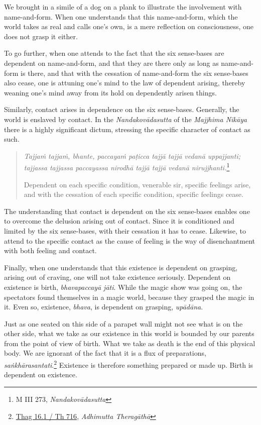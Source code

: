 We brought in a simile of a dog on a plank to illustrate the involvement with name-and-form. When one understands that this name-and-form, which the world takes as real and calls one's own, is a mere reflection on consciousness, one does not grasp it either.

To go further, when one attends to the fact that the six sense-bases are dependent on name-and-form, and that they are there only as long as name-and-form is there, and that with the cessation of name-and-form the six sense-bases also cease, one is attuning one's mind to the law of dependent arising, thereby weaning one's mind away from its hold on dependently arisen things.

Similarly, contact arises in dependence on the six sense-bases. Generally, the world is enslaved by contact. In the \emph{Nandakovādasutta} of the \emph{Majjhima Nikāya} there is a highly significant dictum, stressing the specific character of contact as such.

\begin{quote}
\emph{Tajjaṁ tajjaṁ, bhante, paccayaṁ paṭicca tajjā tajjā vedanā uppajjanti; tajjassa tajjassa paccayassa nirodhā tajjā tajjā vedanā nirujjhanti.}\footnote{M III 273, \emph{Nandakovādasutta}}

Dependent on each specific condition, venerable sir, specific feelings arise, and with the cessation of each specific condition, specific feelings cease.
\end{quote}

The understanding that contact is dependent on the six sense-bases enables one to overcome the delusion arising out of contact. Since it is conditioned and limited by the six sense-bases, with their cessation it has to cease. Likewise, to attend to the specific contact as the cause of feeling is the way of disenchantment with both feeling and contact.

Finally, when one understands that this existence is dependent on grasping, arising out of craving, one will not take existence seriously. Dependent on existence is birth, \emph{bhavapaccayā jāti}. While the magic show was going on, the spectators found themselves in a magic world, because they grasped the magic in it. Even so, existence, \emph{bhava}, is dependent on grasping, \emph{upādāna}.

Just as one seated on this side of a parapet wall might not see what is on the other side, what we take as our existence in this world is bounded by our parents from the point of view of birth. What we take as death is the end of this physical body. We are ignorant of the fact that it is a flux of preparations, \emph{saṅkhārasantati}.\footnote{\href{https://suttacentral.net/thag16.1/pli/ms}{Thag 16.1 / Th 716}, \emph{Adhimutta Theragāthā}} Existence is therefore something prepared or made up. Birth is dependent on existence.

